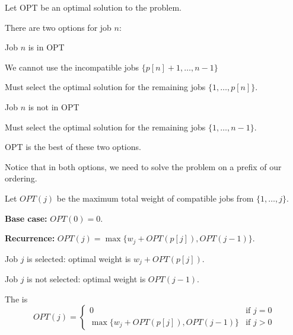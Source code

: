 \begin{listu}
    \item Let OPT be an optimal solution to the problem.

    \item There are two options for job $n$:

    \begin{listu}
        \item Job $n$ is in OPT

        We cannot use the incompatible jobs $\{ p[n] + 1, \dots, n - 1 \}$

        Must select the optimal solution for the remaining jobs $\{1, \dots, p[n]\}$.

        \item Job $n$ is not in OPT

        Must select the optimal solution for the remaining jobs $\{1, \dots, n - 1\}$.
    \end{listu}

    \item OPT is the best of these two options.

    Notice that in both options, we need to solve the problem on a prefix of our ordering.

    \item Let $OPT(j)$ be the maximum total weight of compatible jobs from $\{1, \dots, j\}$.

    \item \textbf{Base case:} $OPT(0) = 0$.

    \item \textbf{Recurrence:} $OPT(j) = \max\{w_j + OPT(p[j]), OPT(j - 1)\}$.

    \begin{listu}
        \item Job $j$ is selected: optimal weight is $w_j + OPT(p[j])$.
        \item Job $j$ is not selected: optimal weight is $OPT(j - 1)$.
    \end{listu}

    The  is \[
        OPT(j) = \begin{cases}
            0                                   & \text{if } j = 0 \\
            \max\{w_j + OPT(p[j]), OPT(j - 1)\} & \text{if } j > 0
        \end{cases}
    \]
\end{listu}

